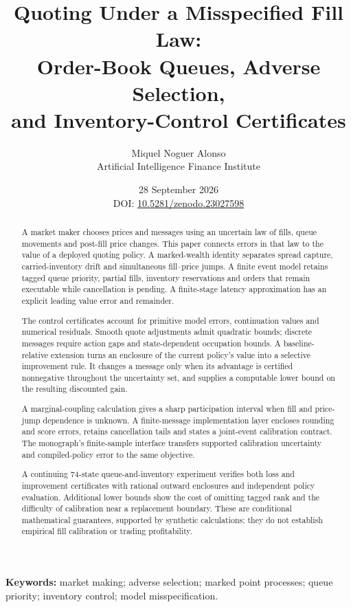 \documentclass[11pt]{article}
\title{Quoting Under a Misspecified Fill Law:\\
Order-Book Queues, Adverse Selection,\\
and Inventory-Control Certificates}
\author{Miquel Noguer Alonso\\
\small Artificial Intelligence Finance Institute}
\date{28 September 2026\\[5pt]\small DOI:
\href{https://doi.org/10.5281/zenodo.23027598}{10.5281/zenodo.23027598}}
\theoremstyle{plain}
\theoremstyle{definition}
\theoremstyle{remark}
\begin{document}
\maketitle
\begin{abstract}
A market maker chooses prices and messages using an uncertain law of fills,
queue movements and post-fill price changes. This paper connects errors in
that law to the value of a deployed quoting policy. A marked-wealth identity
separates spread capture, carried-inventory drift and simultaneous fill--price
jumps. A finite event model retains tagged queue priority, partial fills,
inventory reservations and orders that remain executable while cancellation
is pending. A finite-stage latency approximation has an explicit leading
value error and remainder.

The control certificates account for primitive model errors, continuation
values and numerical residuals. Smooth quote adjustments admit quadratic
bounds; discrete messages require action gaps and state-dependent occupation
bounds. A baseline-relative extension turns an enclosure of the current
policy's value into a selective improvement rule. It changes a message only
when its advantage is certified nonnegative throughout the uncertainty set,
and supplies a computable lower bound on the resulting discounted gain.

A marginal-coupling calculation gives a sharp participation interval when
fill and price-jump dependence is unknown.
A finite-message implementation layer encloses rounding and score errors,
retains cancellation tails and states a joint-event calibration contract.
The monograph's finite-sample interface transfers supported calibration
uncertainty and compiled-policy error to the same objective.

A continuing 74-state queue-and-inventory experiment verifies both loss and
improvement certificates with rational outward enclosures and independent
policy evaluation. Additional lower bounds show the cost of omitting tagged
rank and the difficulty of calibration near a replacement boundary. These
are conditional mathematical guarantees, supported by synthetic calculations;
they do not establish empirical fill calibration or trading profitability.
\end{abstract}
\noindent\textbf{Keywords:} market making; adverse selection; marked point
processes; queue priority; inventory control; model misspecification.

\clearpage
\tableofcontents
\clearpage
\end{document}

